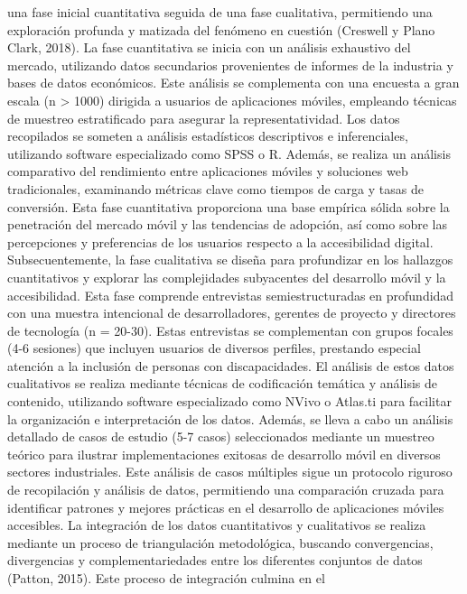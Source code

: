 \documentclass[12pt]{article}
\begin{document}
una fase inicial cuantitativa seguida de una fase cualitativa, permitiendo una exploración profunda y matizada del fenómeno en cuestión (Creswell y Plano Clark, 2018).
La fase cuantitativa se inicia con un análisis exhaustivo del mercado, utilizando datos secundarios provenientes de informes de la industria y bases de datos económicos. Este análisis se complementa con una encuesta a gran escala (n > 1000) dirigida a usuarios de aplicaciones móviles, empleando técnicas de muestreo estratificado para asegurar la representatividad. Los datos recopilados se someten a análisis estadísticos descriptivos e inferenciales, utilizando software especializado como SPSS o R. Además, se realiza un análisis comparativo del rendimiento entre aplicaciones móviles y soluciones web tradicionales, examinando métricas clave como tiempos de carga y tasas de conversión. Esta fase cuantitativa proporciona una base empírica sólida sobre la penetración del mercado móvil y las tendencias de adopción, así como sobre las percepciones y preferencias de los usuarios respecto a la accesibilidad digital.
Subsecuentemente, la fase cualitativa se diseña para profundizar en los hallazgos cuantitativos y explorar las complejidades subyacentes del desarrollo móvil y la accesibilidad. Esta fase comprende entrevistas semiestructuradas en profundidad con una muestra intencional de desarrolladores, gerentes de proyecto y directores de tecnología (n = 20-30). Estas entrevistas se complementan con grupos focales (4-6 sesiones) que incluyen usuarios de diversos perfiles, prestando especial atención a la inclusión de personas con discapacidades. El análisis de estos datos cualitativos se realiza mediante técnicas de codificación temática y análisis de contenido, utilizando software especializado como NVivo o Atlas.ti para facilitar la organización e interpretación de los datos.
Además, se lleva a cabo un análisis detallado de casos de estudio (5-7 casos) seleccionados mediante un muestreo teórico para ilustrar implementaciones exitosas de desarrollo móvil en diversos sectores industriales. Este análisis de casos múltiples sigue un protocolo riguroso de recopilación y análisis de datos, permitiendo una comparación cruzada para identificar patrones y mejores prácticas en el desarrollo de aplicaciones móviles accesibles.
La integración de los datos cuantitativos y cualitativos se realiza mediante un proceso de triangulación metodológica, buscando convergencias, divergencias y complementariedades entre los diferentes conjuntos de datos (Patton, 2015). Este proceso de integración culmina en el
 
\end{document}
